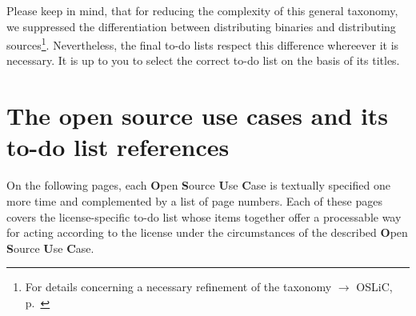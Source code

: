 Please keep in mind, that for reducing the complexity of this general taxonomy,
we suppressed the differentiation between distributing binaries and distributing
sources\footnote{For details concerning a necessary refinement of the taxonomy
$\rightarrow$ OSLiC, p.\ \pageref{sec:SourceBinaryDifference}}. Nevertheless,
the final to-do lists respect this difference whereever it is necessary. It is
up to you to select the correct to-do list on the basis of its titles.

\section{The open source use cases and its to-do list references}

On the following pages, each \textbf{O}pen \textbf{S}ource \textbf{U}se
\textbf{C}ase is textually specified one more time and complemented by a list of
page numbers. Each of these pages covers the license-specific to-do list whose
items together offer a processable way for acting according to the license under
the circumstances of the described \textbf{O}pen \textbf{S}ource \textbf{U}se
\textbf{C}ase.

